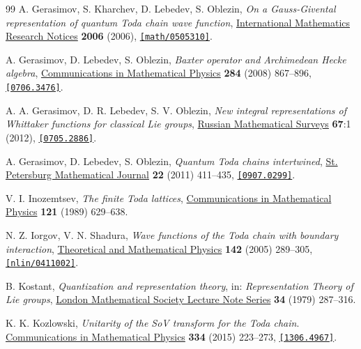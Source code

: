 \documentclass[11pt]{article}
\numberwithin{equation}{section}
\theoremstyle{plain}
\theoremstyle{definition}
\begin{document}
\begin{thebibliography}{99}
	 A. Gerasimov, S. Kharchev, D. Lebedev, S. Oblezin, \textit{On a Gauss-Givental representation of quantum Toda chain wave function}, \href{https://doi.org/10.1155/IMRN/2006/96489}{International Mathematics Research Notices} \textbf{2006} (2006), \href{https://doi.org/10.48550/arXiv.math/0505310}{\tt [math/0505310]}.
	
	 A. Gerasimov, D. Lebedev, S. Oblezin, \textit{Baxter operator and Archimedean Hecke algebra}, \href{https://doi.org/10.1007/s00220-008-0547-9}{Communications in Mathematical Physics} \textbf{284} (2008) 867--896, \href{https://doi.org/10.48550/arXiv.0706.3476}{\tt [0706.3476]}.
	
	 A. A. Gerasimov, D. R. Lebedev, S. V. Oblezin, \textit{New integral representations of Whittaker functions for classical Lie groups}, \href{https://doi.org/10.1070/RM2012v067n01ABEH004776}{Russian Mathematical Surveys} \textbf{67}:1 (2012), \href{https://doi.org/10.48550/arXiv.0705.2886}{\tt [0705.2886]}.
	
	 A. Gerasimov, D. Lebedev, S. Oblezin, \textit{Quantum Toda chains intertwined}, \href{https://doi.org/10.1090/S1061-0022-2011-01149-5}{St. Petersburg Mathematical Journal} \textbf{22} (2011) 411--435, \href{https://doi.org/10.48550/arXiv.0907.0299}{\tt [0907.0299]}.
	
	 V. I. Inozemtsev, \textit{The finite Toda lattices}, \href{https://doi.org/10.1007/BF01218159}{Communications in Mathematical Physics} \textbf{121} (1989) 629--638.
	
	 N. Z. Iorgov, V. N. Shadura, \textit{Wave functions of the Toda chain with boundary interaction}, \href{https://doi.org/10.1007/s11232-005-0075-0}{Theoretical and Mathematical Physics} \textbf{142} (2005) 289--305, \href{https://doi.org/10.48550/arXiv.nlin/0411002}{\tt [nlin/0411002]}.
	
	 B. Kostant, \textit{Quantization and representation theory}, in: \textit{Representation Theory of Lie groups}, \href{https://doi.org/10.1017/CBO9780511662683}{London Mathematical Society Lecture Note Series} \textbf{34} (1979) 287--316.
	
	 K. K. Kozlowski, \textit{Unitarity of the SoV transform for the Toda chain}. \href{https://doi.org/10.1007/s00220-014-2134-6}{Communications in Mathematical Physics} \textbf{334} (2015) 223--273, \href{https://doi.org/10.48550/arXiv.1306.4967}{\tt [1306.4967]}. 
	

\end{thebibliography}
\end{document}
